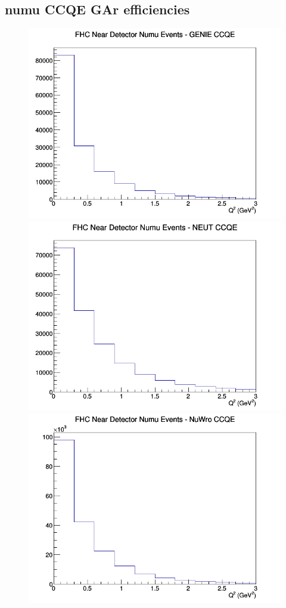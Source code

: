\subsection{numu CCQE GAr efficiencies}
\begin{figure}[h]
\includegraphics[width=\linewidth]{eff_Q2/GAr/CCQE_FHC_ND_numu_Q2_GENIE.png}
\endminipage
{}
\includegraphics[width=\linewidth]{eff_Q2/GAr/CCQE_FHC_ND_numu_Q2_NEUT.png}
\endminipage
{}
\includegraphics[width=\linewidth]{eff_Q2/GAr/CCQE_FHC_ND_numu_Q2_NuWro.png}

\end{figure}
